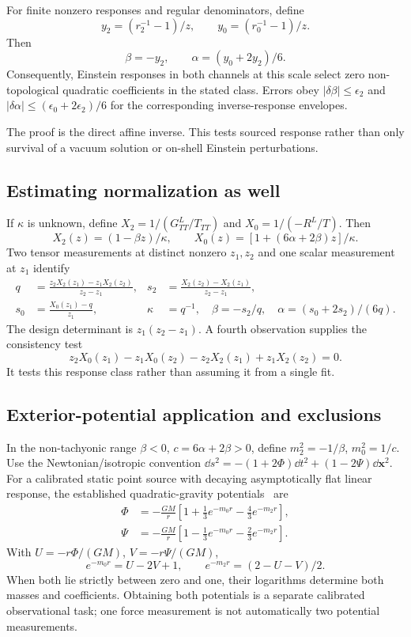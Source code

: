 \documentclass[11pt]{article}
\begin{document}
\begin{proposition}
For finite nonzero responses and regular denominators, define
\[
y_2=(r_2^{-1}-1)/z,\qquad y_0=(r_0^{-1}-1)/z.
\]
Then
\begin{equation}
\boxed{\beta=-y_2,\qquad \alpha=(y_0+2y_2)/6.}
\end{equation}
Consequently, Einstein responses in both channels at this scale select zero non-topological quadratic coefficients in the stated class. Errors obey $|\delta\beta|\le\epsilon_2$ and $|\delta\alpha|\le(\epsilon_0+2\epsilon_2)/6$ for the corresponding inverse-response envelopes.
\end{proposition}
The proof is the direct affine inverse. This tests sourced response rather than only survival of a vacuum solution or on-shell Einstein perturbations.

\subsection{Estimating normalization as well}
If $\kappa$ is unknown, define $X_2=1/(G^L_{TT}/T_{TT})$ and $X_0=1/(-R^L/T)$. Then
\[
X_2(z)=(1-\beta z)/\kappa,\qquad
X_0(z)=[1+(6\alpha+2\beta)z]/\kappa.
\]
Two tensor measurements at distinct nonzero $z_1,z_2$ and one scalar measurement at $z_1$ identify
\begin{align}
q&=\frac{z_2X_2(z_1)-z_1X_2(z_2)}{z_2-z_1},&
s_2&=\frac{X_2(z_2)-X_2(z_1)}{z_2-z_1},\\
s_0&=\frac{X_0(z_1)-q}{z_1},&
\kappa&=q^{-1},\quad\beta=-s_2/q,\quad\alpha=(s_0+2s_2)/(6q).
\end{align}
The design determinant is $z_1(z_2-z_1)$. A fourth observation supplies the consistency test
\[
z_2X_0(z_1)-z_1X_0(z_2)-z_2X_2(z_1)+z_1X_2(z_2)=0.
\]
It tests this response class rather than assuming it from a single fit.

\subsection{Exterior-potential application and exclusions}
In the non-tachyonic range $\beta<0$, $c=6\alpha+2\beta>0$, define $m_2^2=-1/\beta$, $m_0^2=1/c$. Use the Newtonian/isotropic convention $\dd s^2=-(1+2\Phi)\dd t^2+(1-2\Psi)\dd\mathbf x^2$. For a calibrated static point source with decaying asymptotically flat linear response, the established quadratic-gravity potentials~\cite{Salvio} are
\begin{align}
\Phi&=-\frac{GM}{r}\left[1+\tfrac13e^{-m_0r}-\tfrac43e^{-m_2r}\right],\\
\Psi&=-\frac{GM}{r}\left[1-\tfrac13e^{-m_0r}-\tfrac23e^{-m_2r}\right].
\end{align}
With $U=-r\Phi/(GM)$, $V=-r\Psi/(GM)$,
\[
e^{-m_0r}=U-2V+1,\qquad e^{-m_2r}=(2-U-V)/2.
\]
When both lie strictly between zero and one, their logarithms determine both masses and coefficients. Obtaining both potentials is a separate calibrated observational task; one force measurement is not automatically two potential measurements.
\end{document}

